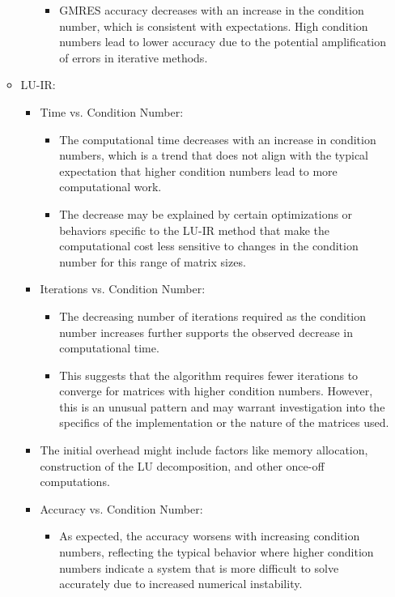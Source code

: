 \begin{enumerate}
\begin{itemize}
\begin{itemize}
            \begin{itemize}
                \item GMRES accuracy decreases with an increase in the condition number, which is consistent with expectations. High condition numbers lead to lower accuracy due to the potential amplification of errors in iterative methods.
            \end{itemize}
        \end{itemize}
        \item LU-IR:
        \begin{itemize}
            \item  Time vs. Condition Number:
            \begin{itemize}
                \item The computational time decreases with an increase in condition numbers, which is a trend that does not align with the typical expectation that higher condition numbers lead to more computational work.
               \item  The decrease may be explained by certain optimizations or behaviors specific to the LU-IR method that make the computational cost less sensitive to changes in the condition number for this range of matrix sizes.
            \end{itemize}
            \item Iterations vs. Condition Number:
            \begin{itemize}
                \item The decreasing number of iterations required as the condition number increases further supports the observed decrease in computational time.
                \item This suggests that the algorithm requires fewer iterations to converge for matrices with higher condition numbers. However, this is an unusual pattern and may warrant investigation into the specifics of the implementation or the nature of the matrices used.
            \end{itemize}
            \item The initial overhead might include factors like memory allocation, construction of the LU decomposition, and other once-off computations.
            \item Accuracy vs. Condition Number:
            \begin{itemize}
                \item As expected, the accuracy worsens with increasing condition numbers, reflecting the typical behavior where higher condition numbers indicate a system that is more difficult to solve accurately due to increased numerical instability.

\end{itemize}
\end{itemize}
\end{itemize}
\end{enumerate}
